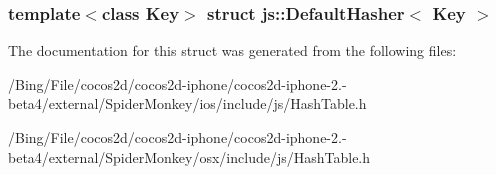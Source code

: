 \subsubsection*{template$<$class Key$>$ struct js\-::\-Default\-Hasher$<$ Key $>$}



The documentation for this struct was generated from the following files\-:\begin{DoxyCompactItemize}
\item 
/\-Bing/\-File/cocos2d/cocos2d-\/iphone/cocos2d-\/iphone-\/2.-\/beta4/external/\-Spider\-Monkey/ios/include/js/Hash\-Table.\-h\item 
/\-Bing/\-File/cocos2d/cocos2d-\/iphone/cocos2d-\/iphone-\/2.-\/beta4/external/\-Spider\-Monkey/osx/include/js/Hash\-Table.\-h\end{DoxyCompactItemize}
